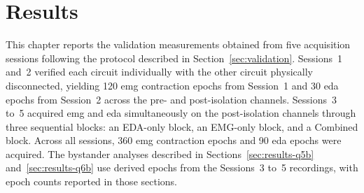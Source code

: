 %
%
%
%
%

\chapter{Results}
\label{ch:results}

This chapter reports the validation measurements obtained from five acquisition sessions following the protocol described in Section~\ref{sec:validation}. Sessions~1 and~2 verified each circuit individually with the other circuit physically disconnected, yielding 120 \gls{emg} contraction epochs from Session~1 and 30 \gls{eda} epochs from Session~2 across the pre- and post-isolation channels. Sessions~3 to~5 acquired \gls{emg} and \gls{eda} simultaneously on the post-isolation channels through three sequential blocks: an EDA-only block, an EMG-only block, and a Combined block. Across all sessions, 360 \gls{emg} contraction epochs and 90 \gls{eda} epochs were acquired. The bystander analyses described in Sections~\ref{sec:results-q5b} and~\ref{sec:results-q6b} use derived epochs from the Sessions~3 to~5 recordings, with epoch counts reported in those sections.

